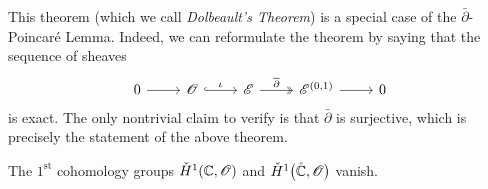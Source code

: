 \documentclass[../Moduli_Spaces_of_Riemann_Surfaces.tex]{subfiles}
\begin{document}
    \begin{remark}
        This theorem (which we call \textit{Dolbeault's Theorem}) is a special case of the $\bar{\partial}$-Poincaré Lemma. Indeed, we can reformulate the theorem by saying that the sequence of sheaves
        \begin{equation*}
            \begin{tikzcd}
                0 \ar[r] & \HOLO \ar[r, "\iota", hookrightarrow] & \DIFF \ar[r, "\bar{\partial}", twoheadrightarrow] & \DIFF^{\l(0,1\r)} \ar[r] & 0
            \end{tikzcd}
        \end{equation*}
        is exact. The only nontrivial claim to verify is that $\bar{\partial}$ is surjective, which is precisely the statement of the above theorem.\exqed
    \end{remark}
    \begin{corollary}
        The $1^\textrm{st}$ cohomology groups $\check{H}^1\!\left(\mathbb{C},\mathscr{O}\right)$ and $\check{H}^1\big(\hat{\mathbb{C}},\mathscr{O}\big)$ vanish.
    \end{corollary}
\end{document}
